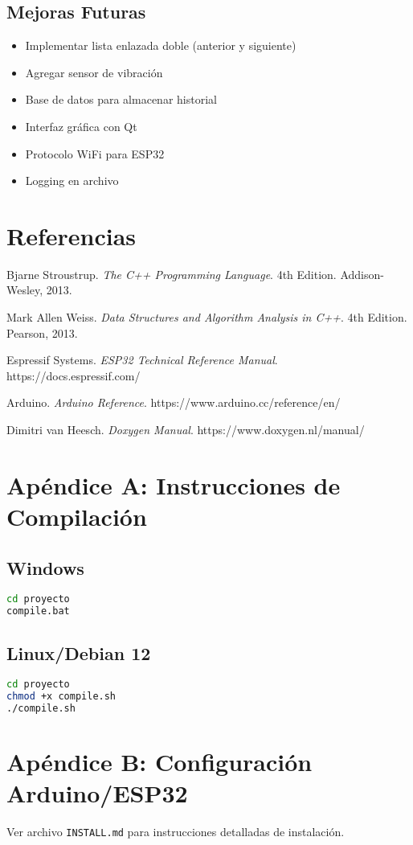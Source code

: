 \documentclass[12pt, spanish]{article}
\newcommand{\secc}[1]{\section{#1}\vspace{0.3cm}}
\begin{document}
\subsection{Mejoras Futuras}

\begin{itemize}
    \item Implementar lista enlazada doble (anterior y siguiente)
    \item Agregar sensor de vibración
    \item Base de datos para almacenar historial
    \item Interfaz gráfica con Qt
    \item Protocolo WiFi para ESP32
    \item Logging en archivo
\end{itemize}

\secc{Referencias}

\begin{thebibliography}{9}

Bjarne Stroustrup. \textit{The C++ Programming Language}. 4th Edition. Addison-Wesley, 2013.

Mark Allen Weiss. \textit{Data Structures and Algorithm Analysis in C++}. 4th Edition. Pearson, 2013.

Espressif Systems. \textit{ESP32 Technical Reference Manual}. https://docs.espressif.com/

Arduino. \textit{Arduino Reference}. https://www.arduino.cc/reference/en/

Dimitri van Heesch. \textit{Doxygen Manual}. https://www.doxygen.nl/manual/

\end{thebibliography}

\newpage
\appendix

\secc{Apéndice A: Instrucciones de Compilación}

\subsection{Windows}
\begin{lstlisting}[language=bash]
cd proyecto
compile.bat
\end{lstlisting}

\subsection{Linux/Debian 12}
\begin{lstlisting}[language=bash]
cd proyecto
chmod +x compile.sh
./compile.sh
\end{lstlisting}

\secc{Apéndice B: Configuración Arduino/ESP32}

Ver archivo \texttt{INSTALL.md} para instrucciones detalladas de instalación.
\end{document}
